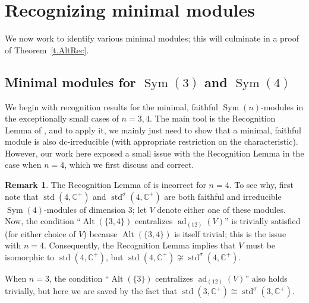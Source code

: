 \documentclass[a4paper, 11pt]{amsart}
\theoremstyle{plain}
\theoremstyle{definition}
\newtheorem{remark}[theorem]{Remark}
\theoremstyle{remark}
\DeclareMathOperator{\ad}{ad}
\DeclareMathOperator{\Sym}{Sym}
\DeclareMathOperator{\Alt}{Alt}
\DeclareMathOperator{\std}{std}
\begin{document}
\section{Recognizing minimal modules}

We now work to identify various minimal modules; this will culminate in  a proof of Theorem~\ref{t.AltRec}.

\subsection{Minimal modules for \texorpdfstring{$\Sym(3)$}{Sym(3)} and \texorpdfstring{$\Sym(4)$}{Sym(4)}}
We begin with recognition results for the minimal, faithful $\Sym(n)$-modules in the exceptionally small cases of $n=3,4$. The main tool is the Recognition Lemma of \cite{CDW23}, and to apply it, we mainly just need to show that a minimal, faithful module is also dc-irreducible (with appropriate restriction on the characteristic). However, our work here exposed a small issue with the Recognition Lemma in the case when $n=4$, which we first discuss and correct.

\begin{remark}
The Recognition Lemma of \cite{CDW23} is incorrect for $n=4$. To see why, 
first note that $\std(4,\mathbb{C}^+)$ and $\std^\sigma(4,\mathbb{C}^+)$ are both faithful and irreducible $\Sym(4)$-modules of dimension $3$; let $V$ denote either one of these modules.  Now, the condition ``$\Alt(\{3,4\})$ centralizes $\ad_{(12)}(V)$'' is trivially satisfied (for either choice of $V$) because $\Alt(\{3,4\})$ is itself trivial; this is the issue with $n=4$. Consequently, the Recognition Lemma implies that $V$ must be isomorphic to $\std(4,\mathbb{C}^+)$, but $\std(4,\mathbb{C}^+)\not\cong \std^\sigma(4,\mathbb{C}^+)$. 

When $n=3$, the condition ``$\Alt(\{3\})$ centralizes $\ad_{(12)}(V)$'' also holds trivially, but here we are saved by the fact that $\std(3,\mathbb{C}^+)\cong\std^\sigma(3,\mathbb{C}^+)$.
\end{remark}
\end{document}
